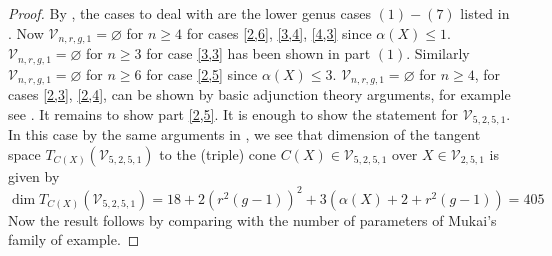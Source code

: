 \documentclass[11pt,twoside]{amsart}
\theoremstyle{plain}
\numberwithin{equation}{section}
\theoremstyle{definition}
\begin{document}
\begin{proof}
   By , the cases to deal with are the lower genus cases $(1)-(7)$  listed in . Now $\mathcal{V}_{n,r,g,1} = \varnothing$ for $n \geq 4$ for cases \ref{2,6}, \ref{3,4}, \ref{4,3} since $\alpha(X) \leq 1$. $\mathcal{V}_{n,r,g,1} = \varnothing$ for $n \geq 3$ for case \ref{3,3} has been shown in  part $(1)$. Similarly $\mathcal{V}_{n,r,g,1} = \varnothing$ for $n \geq 6$ for case \ref{2,5} since $\alpha(X) \leq 3$.  $\mathcal{V}_{n,r,g,1} = \varnothing$ for $n \geq 4$, for cases \ref{2,3}, \ref{2,4}, can be shown by basic adjunction theory arguments, for example see \cite[Theorem $3.11$]{CLM98}. It remains to show part \ref{2,5}. It is enough to show the statement for $\mathcal{V}_{5,2,5,1}$. In this case by the same arguments in , we see that dimension of the tangent space $T_{C(X)}(\mathcal{V}_{5,2,5,1})$ to the (triple) cone $C(X) \in \mathcal{V}_{5,2,5,1}$ over $X \in \mathcal{V}_{2,5,1}$ is given by 
   $$\operatorname{dim}T_{C(X)}(\mathcal{V}_{5,2,5,1}) = 18+2(r^2(g-1))^2+3(\alpha(X)+2+r^2(g-1)) = 405$$
   Now the result follows by comparing with the number of parameters of Mukai's family of example.


\end{proof}
\end{document}

